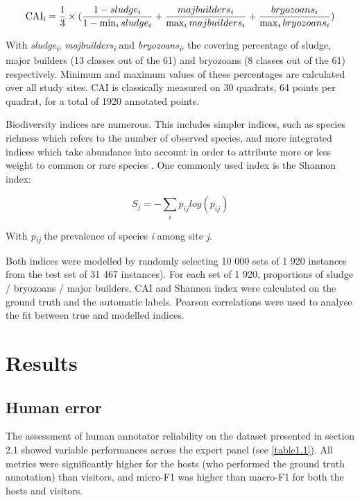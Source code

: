 \begin{equation}
\text{CAI\textsubscript{i}}=\frac{1}{3}\times(\frac{1-sludge_i}{1-\min_{i}sludge_i}+\frac{majbuilders_i}{\max_{i}majbuilders_i}+\frac{bryozoans_i}{\max_{i}bryozoans_i})
\end{equation}

With \textit{sludge\textsubscript{i}}, \textit{majbuilders\textsubscript{i}} and \textit{bryozoans\textsubscript{i}}, the covering percentage of sludge, major builders (13 classes out of the 61) and bryozoans (8 classes out of the 61) respectively. Minimum and maximum values of these percentages are calculated over all study sites. CAI is classically measured on 30 quadrats, 64 points per quadrat, for a total of 1920 annotated points.

Biodiversity indices are numerous. This includes simpler indices, such as species richness which refers to the number of observed species, and more integrated indices which take abundance into account in order to attribute more or less weight to common or rare species \citep{magurran_measuring_2004}. One commonly used index is the Shannon index:

\begin{equation}
	S_j=-\sum_{i}p_{ij} log(p_{ij})
\end{equation}

With \textit{p\textsubscript{ij}} the prevalence of species \textit{i} among site \textit{j}.

Both indices were modelled by randomly selecting 10 000 sets of 1 920 instances from the test set of 31 467 instances). For each set of 1 920, proportions of sludge / bryozoans / major builders, CAI and Shannon index were calculated on the ground truth and the automatic labels. Pearson correlations were used to analyse the fit between true and modelled indices.

\section{Results}\label{chapitre1_6}

\subsection{Human error}\label{chapitre1_6.1}
The assessment of human annotator reliability on the dataset presented in section 2.1 showed variable performances across the expert panel (see \autoref{table1.1}). All metrics were significantly higher for the hosts (who performed the ground truth annotation) than visitors, and micro-F1 was higher than macro-F1 for both the hosts and visitors.


